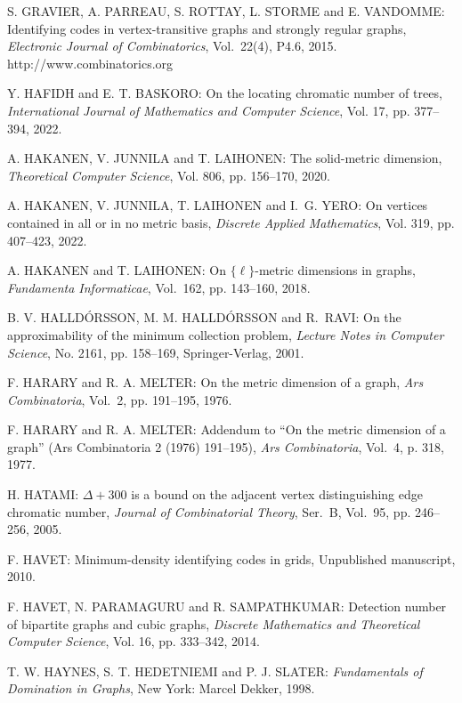 \begin{thebibliography}{999}
S. GRAVIER, A. PARREAU, S. ROTTAY, L. STORME and E. VANDOMME: Identifying codes in vertex-transitive graphs and strongly regular graphs, {\it Electronic Journal of Combinatorics}, Vol.~22(4), P4.6, 2015.\\
http://www.combinatorics.org

Y. HAFIDH and E. T. BASKORO: On the locating chromatic number of trees, {\it  International Journal of Mathematics and Computer Science}, Vol. 17, pp. 377--394, 2022.

A. HAKANEN, V. JUNNILA and T. LAIHONEN: The solid-metric dimension, {\it Theoretical Computer Science}, Vol. 806, pp. 156--170, 2020.

A. HAKANEN, V. JUNNILA, T. LAIHONEN and I.~G. YERO: On vertices contained in all or in no metric basis, {\it Discrete Applied Mathematics}, Vol. 319, pp. 407--423, 2022.

A. HAKANEN and T. LAIHONEN: On $\{\ell\}$-metric dimensions in graphs, {\it Fundamenta Informaticae}, Vol.~162, pp. 143--160, 2018. 

B. V. HALLD\'ORSSON, M. M. HALLD\'ORSSON and R.~RAVI: On the approximability of the minimum collection problem, {\it Lecture Notes in Computer Science}, No. 2161, pp. 158--169, Springer-Verlag, 2001.

F. HARARY and R. A. MELTER: On the metric dimension of a graph, {\it Ars Combinatoria}, Vol.~2, pp. 191--195, 1976.

F. HARARY and R. A. MELTER: Addendum to ``On the metric dimension of a graph'' (Ars Combinatoria 2 (1976) 191--195), {\it Ars Combinatoria}, Vol.~4, p. 318, 1977.

H. HATAMI: $\Delta +300$ is a bound on the adjacent vertex distinguishing edge chromatic number, {\it Journal of Combinatorial Theory}, Ser.~B, Vol.~95, pp. 246--256, 2005.

F. HAVET: Minimum-density identifying codes in grids, Unpublished manuscript, 2010.

F. HAVET, N. PARAMAGURU and R. SAMPATHKUMAR: Detection number of bipartite graphs and cubic graphs, {\it Discrete Mathematics and Theoretical Computer Science}, Vol. 16, pp. 333--342, 2014.

T. W. HAYNES, S. T. HEDETNIEMI and P. J. SLATER: {\it Fundamentals of Domination in Graphs}, New York: Marcel Dekker, 1998.


\end{thebibliography}
